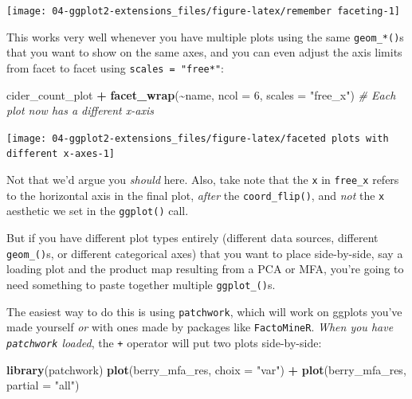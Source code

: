 \documentclass[
]{book}
\newenvironment{Shaded}{\begin{snugshade}}{\end{snugshade}}
\newcommand{\AttributeTok}[1]{\textcolor[rgb]{0.13,0.29,0.53}{#1}}
\newcommand{\CommentTok}[1]{\textcolor[rgb]{0.56,0.35,0.01}{\textit{#1}}}
\newcommand{\DecValTok}[1]{\textcolor[rgb]{0.00,0.00,0.81}{#1}}
\newcommand{\FunctionTok}[1]{\textcolor[rgb]{0.13,0.29,0.53}{\textbf{#1}}}
\newcommand{\NormalTok}[1]{#1}
\newcommand{\SpecialCharTok}[1]{\textcolor[rgb]{0.81,0.36,0.00}{\textbf{#1}}}
\newcommand{\StringTok}[1]{\textcolor[rgb]{0.31,0.60,0.02}{#1}}
\begin{document}
\begin{center}\texttt{[image: 04-ggplot2-extensions\_files/figure-latex/remember faceting-1]} \end{center}

This works very well whenever you have multiple plots using the same \texttt{geom\_*()}s that you want to show on the same axes, and you can even adjust the axis limits from facet to facet using \texttt{scales\ =\ "free*"}:

\begin{Shaded}
\begin{Highlighting}[]
\NormalTok{cider\_count\_plot }\SpecialCharTok{+}
  \FunctionTok{facet\_wrap}\NormalTok{(}\SpecialCharTok{\textasciitilde{}}\NormalTok{name, }\AttributeTok{ncol =} \DecValTok{6}\NormalTok{,}
             \AttributeTok{scales =} \StringTok{"free\_x"}\NormalTok{) }\CommentTok{\# Each plot now has a different x{-}axis}
\end{Highlighting}
\end{Shaded}

\begin{center}\texttt{[image: 04-ggplot2-extensions\_files/figure-latex/faceted plots with different x-axes-1]} \end{center}

Not that we'd argue you \emph{should} here. Also, take note that the \texttt{x} in \texttt{free\_x} refers to the horizontal axis in the final plot, \emph{after} the \texttt{coord\_flip()}, and \emph{not} the \texttt{x} aesthetic we set in the \texttt{ggplot()} call.

But if you have different plot types entirely (different data sources, different \texttt{geom\_()}s, or different categorical axes) that you want to place side-by-side, say a loading plot and the product map resulting from a PCA or MFA, you're going to need something to paste together multiple \texttt{ggplot\_()}s.

The easiest way to do this is using \texttt{patchwork}, which will work on ggplots you've made yourself \emph{or} with ones made by packages like \texttt{FactoMineR}. \emph{When you have \texttt{patchwork} loaded}, the \texttt{+} operator will put two plots side-by-side:

\begin{Shaded}
\begin{Highlighting}[]
\FunctionTok{library}\NormalTok{(patchwork)}
\FunctionTok{plot}\NormalTok{(berry\_mfa\_res, }\AttributeTok{choix =} \StringTok{"var"}\NormalTok{) }\SpecialCharTok{+} \FunctionTok{plot}\NormalTok{(berry\_mfa\_res, }\AttributeTok{partial =} \StringTok{"all"}\NormalTok{)}
\end{Highlighting}
\end{Shaded}
\end{document}
